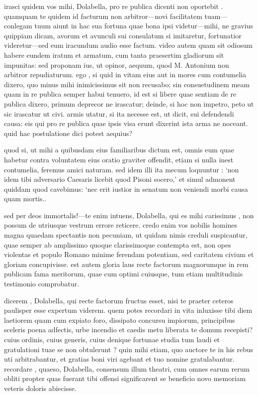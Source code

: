  irasci quidem vos mihi, Dolabella, pro re publica dicenti non oportebit . quamquam te quidem id facturum non arbitror—novi facilitatem tuam—conlegam tuum aiunt in hac sua fortuna quae bona ipsi videtur—mihi, ne gravius quippiam dicam, avorum et avunculi sui consulatum si imitaretur, fortunatior videretur—sed eum iracundum audio esse factum. video autem quam sit odiosum habere eundem iratum et armatum, cum tanta praesertim gladiorum sit impunitas: sed proponam ius, ut opinor, aequum, quod M. Antonium non arbitror repudiaturum. ego , si quid in vitam eius aut in mores cum contumelia dixero, quo minus mihi inimicissimus sit non recusabo; sin consuetudinem meam quam in re publica semper habui tenuero, id est si libere quae sentiam de re publica dixero, primum deprecor ne irascatur; deinde, si hoc non impetro, peto ut sic irascatur ut civi. armis utatur, si ita necesse est, ut dicit, sui defendendi causa: eis qui pro re publica quae ipsis visa erunt dixerint ista arma ne noceant. quid hac postulatione dici potest aequius?

 quod si, ut mihi a quibusdam eius familiaribus dictum est, omnis eum quae habetur contra voluntatem eius oratio graviter offendit, etiam si nulla inest contumelia, feremus amici naturam. sed idem illi ita mecum loquuntur : `non idem tibi adversario Caesaris licebit quod Pisoni socero,' et simul admonent quiddam quod cavebimus: `nec erit iustior in senatum non veniendi morbi causa quam mortis..

 sed per deos immortalis!—te enim intuens, Dolabella, qui es mihi carissimus , non possum de utriusque vestrum errore reticere. credo enim vos nobilis homines magna quaedam spectantis non pecuniam, ut quidam nimis creduli suspicantur, quae semper ab amplissimo quoque clarissimoque contempta est, non opes violentas et populo Romano minime ferendam potentiam, sed caritatem civium et gloriam concupivisse. est autem gloria laus recte factorum magnorumque in rem publicam fama meritorum, quae cum optimi cuiusque, tum etiam multitudinis testimonio comprobatur.

 dicerem , Dolabella, qui recte factorum fructus esset, nisi te praeter ceteros paulisper esse expertum viderem. quem potes recordari in vita inluxisse tibi diem laetiorem quam cum expiato foro, dissipato concursu impiorum, principibus sceleris poena adfectis, urbe incendio et caedis metu liberata te domum recepisti? cuius ordinis, cuius generis, cuius denique fortunae studia tum laudi et gratulationi tuae se non obtulerunt ? quin mihi etiam, quo auctore te in his rebus uti arbitrabantur, et gratias boni viri agebant et tuo nomine gratulabantur. recordare , quaeso, Dolabella, consensum illum theatri, cum omnes earum rerum obliti propter quas fuerant tibi offensi significarent se beneficio novo memoriam veteris doloris abiecisse.

